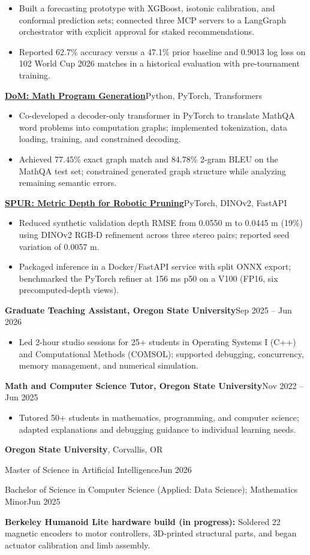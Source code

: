 \documentclass[letterpaper,10pt]{article}
\newcommand{\resumeSection}[1]{\par\vspace{7pt}{\large\bfseries #1}\par\vspace{3pt}}
\newcommand{\project}[3]{\par\vspace{3pt}\textbf{\href{#2}{#1}}\enspace\textbar\enspace #3\par}
\newcommand{\resumeItem}[1]{\item #1}
\begin{document}
\begin{itemize}
\resumeItem{Built a forecasting prototype with XGBoost, isotonic calibration, and conformal prediction sets; connected three MCP servers to a LangGraph orchestrator with explicit approval for staked recommendations.}
\resumeItem{Reported 62.7\% accuracy versus a 47.1\% prior baseline and 0.9013 log loss on 102 World Cup 2026 matches in a historical evaluation with pre-tournament training.}
\end{itemize}
\project{DoM: Math Program Generation}{https://github.com/joses2017smjh/OMR_LLM}{Python, PyTorch, Transformers}
\begin{itemize}
\resumeItem{Co-developed a decoder-only transformer in PyTorch to translate MathQA word problems into computation graphs; implemented tokenization, data loading, training, and constrained decoding.}
\resumeItem{Achieved 77.45\% exact graph match and 84.78\% 2-gram BLEU on the MathQA test set; constrained generated graph structure while analyzing remaining semantic errors.}
\end{itemize}
\project{SPUR: Metric Depth for Robotic Pruning}{https://github.com/joses2017smjh/spur-depth-service}{PyTorch, DINOv2, FastAPI}
\begin{itemize}
\resumeItem{Reduced synthetic validation depth RMSE from 0.0550 m to 0.0445 m (19\%) using DINOv2 RGB-D refinement across three stereo pairs; reported seed variation of 0.0057 m.}
\resumeItem{Packaged inference in a Docker/FastAPI service with split ONNX export; benchmarked the PyTorch refiner at 156 ms p50 on a V100 (FP16, six precomputed-depth views).}
\end{itemize}
\resumeSection{Experience}
\textbf{Graduate Teaching Assistant, Oregon State University}\enspace\textbar\enspace Sep 2025 -- Jun 2026\par
\begin{itemize}
\resumeItem{Led 2-hour studio sessions for 25+ students in Operating Systems I (C++) and Computational Methods (COMSOL); supported debugging, concurrency, memory management, and numerical simulation.}
\end{itemize}
\textbf{Math and Computer Science Tutor, Oregon State University}\enspace\textbar\enspace Nov 2022 -- Jun 2025\par
\begin{itemize}
\resumeItem{Tutored 50+ students in mathematics, programming, and computer science; adapted explanations and debugging guidance to individual learning needs.}
\end{itemize}
\resumeSection{Education}
\textbf{Oregon State University}, Corvallis, OR\par
Master of Science in Artificial Intelligence\enspace\textbar\enspace Jun 2026\par
Bachelor of Science in Computer Science (Applied: Data Science); Mathematics Minor\enspace\textbar\enspace Jun 2025\par
\resumeSection{Additional Experience}
\textbf{Berkeley Humanoid Lite hardware build (in progress):} Soldered 22 magnetic encoders to motor controllers, 3D-printed structural parts, and began actuator calibration and limb assembly.
\end{document}
